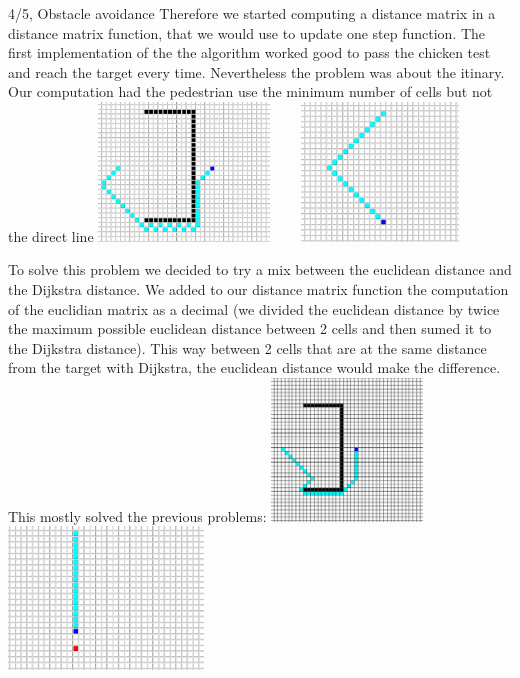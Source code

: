\documentclass[10pt,a4paper]{article}
\begin{document}
\begin{task}{4/5, Obstacle avoidance}
Therefore we started computing a distance matrix in a distance matrix function, that we would use to update one step function.
The first implementation of the the algorithm worked good to pass the chicken test and reach the target every time.
Nevertheless the problem was about the itinary. Our computation had the pedestrian use the minimum number of cells but not the direct line \newline \newline
\includegraphics[height=3.7cm]{Dijk1}
~~~
\includegraphics[height=3.7cm]{Dijk2} \newline 

To solve this problem we decided to try a mix between the euclidean distance and the Dijkstra distance. We added to our distance matrix function the computation of the euclidian matrix as a decimal (we divided the euclidean distance by twice the maximum possible euclidean distance between 2 cells and then sumed it to the Dijkstra distance). This way between 2 cells that are at the same distance from the target with Dijkstra, the euclidean distance would make the difference. This mostly solved the previous problems: \newline \newline
\includegraphics[height=3.8cm]{Prct1}
~~~
\includegraphics[height=3.8cm]{Dijk3} \newline 


\end{task}
\end{document}
